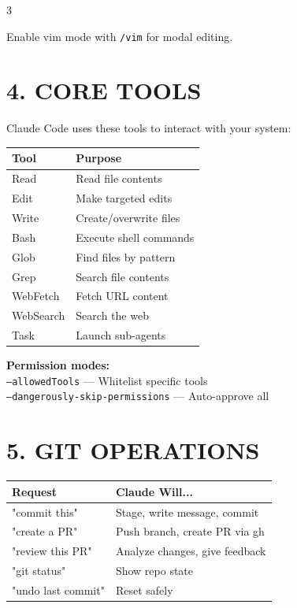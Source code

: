 \documentclass[landscape,11pt]{article}
\begin{document}
\begin{multicols}{3}
\vspace{2mm}
\begin{tcolorbox}[colback=claudegreen!8, colframe=claudegreen, boxsep=2pt, arc=1pt, fontupper=\small\itshape]
Enable vim mode with \texttt{/vim} for modal editing.
\end{tcolorbox}

\section*{\textcolor{claudepurple}{4. CORE TOOLS}}
Claude Code uses these tools to interact with your system:

\renewcommand{\arraystretch}{1.15}
\begin{tabularx}{\linewidth}{@{}>{\ttfamily}l>{\raggedright\arraybackslash}X@{}}
\normalfont\textbf{Tool} & \textbf{Purpose}\\
\hline
Read & Read file contents\\
Edit & Make targeted edits\\
Write & Create/overwrite files\\
Bash & Execute shell commands\\
Glob & Find files by pattern\\
Grep & Search file contents\\
WebFetch & Fetch URL content\\
WebSearch & Search the web\\
Task & Launch sub-agents\\
\end{tabularx}
\renewcommand{\arraystretch}{1}

\vspace{2mm}
\begin{tcolorbox}[colback=claudepurple!8, colframe=claudepurple, boxsep=2pt, arc=1pt, fontupper=\small]
\textbf{Permission modes:}\\
\texttt{--allowedTools} — Whitelist specific tools\\
\texttt{--dangerously-skip-permissions} — Auto-approve all
\end{tcolorbox}

\section*{\textcolor{BrickRed}{5. GIT OPERATIONS}}
\renewcommand{\arraystretch}{1.15}
\begin{tabularx}{\linewidth}{@{}>{\ttfamily}l>{\raggedright\arraybackslash}X@{}}
\normalfont\textbf{Request} & \textbf{Claude Will...}\\
\hline
"commit this" & Stage, write message, commit\\
"create a PR" & Push branch, create PR via gh\\
"review this PR" & Analyze changes, give feedback\\
"git status" & Show repo state\\
"undo last commit" & Reset safely\\
\end{tabularx}
\renewcommand{\arraystretch}{1}


\end{multicols}
\end{document}
